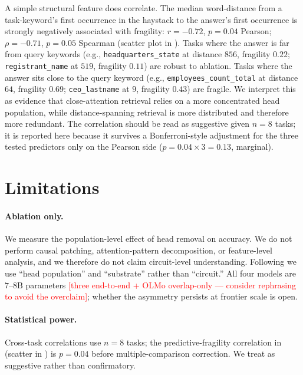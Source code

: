 \documentclass{article}
\newcommand{\taskpill}[1]{\colorbox{gray!15}{\texttt{\small #1}}}
\theoremstyle{plain}
\theoremstyle{definition}
\theoremstyle{remark}
\begin{document}
A simple structural feature does correlate. The median word-distance from a task-keyword's first occurrence in the haystack to the answer's first occurrence is strongly negatively associated with fragility: $r = -0.72$, $p = 0.04$ Pearson; $\rho = -0.71$, $p = 0.05$ Spearman (scatter plot in ). Tasks where the answer is far from query keywords (e.g., \taskpill{headquarters\_state} at distance $856$, fragility $0.22$; \taskpill{registrant\_name} at $519$, fragility $0.11$) are robust to ablation. Tasks where the answer sits close to the query keyword (e.g., \taskpill{employees\_count\_total} at distance $64$, fragility $0.69$; \taskpill{ceo\_lastname} at $9$, fragility $0.43$) are fragile. We interpret this as evidence that close-attention retrieval relies on a more concentrated head population, while distance-spanning retrieval is more distributed and therefore more redundant. The correlation should be read as suggestive given $n{=}8$ tasks; it is reported here because it survives a Bonferroni-style adjustment for the three tested predictors only on the Pearson side ($p = 0.04 \times 3 = 0.13$, marginal).

\section{Limitations}
\label{sec:limitations}

\paragraph{Ablation only.} We measure the population-level effect of head removal on accuracy. We do not perform causal patching, attention-pattern decomposition, or feature-level analysis, and we therefore do not claim circuit-level understanding. Following \citet{sharkey2025openproblems} we use ``head population'' and ``substrate'' rather than ``circuit.'' All four models are $7$--$8$B parameters\textcolor{red}{ [three end-to-end + OLMo overlap-only --- consider rephrasing to avoid the overclaim]}; whether the asymmetry persists at frontier scale is open.

\paragraph{Statistical power.} Cross-task correlations use $n{=}8$ tasks; the predictive-fragility correlation in  (scatter in ) is $p = 0.04$ before multiple-comparison correction. We treat  as suggestive rather than confirmatory.
\end{document}
